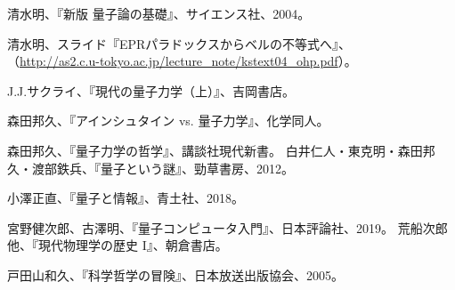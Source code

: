 \documentclass[10pt,b5paper,papersize,dvipdfmx]{jsbook}
\begin{document}
\begin{thebibliography}{99}
  \item 清水明、『新版 量子論の基礎』、サイエンス社、2004。
  \item 清水明、スライド『EPRパラドックスからベルの不等式へ』、\\
  （\url{http://as2.c.u-tokyo.ac.jp/lecture_note/kstext04_ohp.pdf}）。
  \item J.J.サクライ、『現代の量子力学（上）』、吉岡書店。
  \item 森田邦久、『アインシュタイン vs. 量子力学』、化学同人。
  \item 森田邦久、『量子力学の哲学』、講談社現代新書。
   白井仁人・東克明・森田邦久・渡部鉄兵、『量子という謎』、勁草書房、2012。
  \item 小澤正直、『量子と情報』、青土社、2018。
  \item 宮野健次郎、古澤明、『量子コンピュータ入門』、日本評論社、2019。
   荒船次郎 他、『現代物理学の歴史 I』、朝倉書店。
  \item 戸田山和久、『科学哲学の冒険』、日本放送出版協会、2005。
\end{thebibliography}
\end{document}
